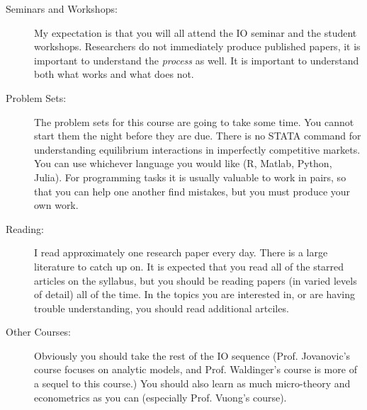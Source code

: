 \documentclass[11pt]{article}
\begin{document}
\begin{description}
\item[Seminars and Workshops:] My expectation is that you will all attend the IO seminar and the student workshops. Researchers do not immediately produce published papers, it is important to understand the \textit{process} as well. It is important to understand both what works and what does not.
\item[Problem Sets:] The problem sets for this course are going to take some time. You cannot start them the night before they are due. There is no STATA command for understanding equilibrium interactions in imperfectly competitive markets. You can use whichever language you would like (R, Matlab, Python, Julia). For programming tasks it is usually valuable to work in pairs, so that you can help one another find mistakes, but you must produce your own work. 
\item[Reading:] I read approximately one research paper every day. There is a large literature to catch up on. It is expected that you read all of the starred articles on the syllabus, but you should be reading papers (in varied levels of detail) all of the time. In the topics you are interested in, or are having trouble understanding, you should read additional artciles.
\item[Other Courses:] Obviously you should take the rest of the IO sequence (Prof. Jovanovic's course focuses on analytic models, and Prof. Waldinger's course is more of a sequel to this course.) You should also learn as much micro-theory and econometrics as you can (especially Prof. Vuong's course).
\end{description}
\end{document}
